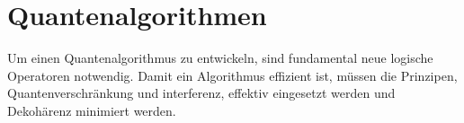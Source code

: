 \newcommand{\hadamard}{\ensuremath{%
  \frac{1}{\sqrt{2}}
  \begin{pmatrix}
    1 & 1 \\
    1 & -1
  \end{pmatrix}%
}}

\newcommand{\qubitnull}{\ensuremath{\begin{pmatrix}1\\0\end{pmatrix}}}
\newcommand{\qubiteins}{\ensuremath{\begin{pmatrix}0\\1\end{pmatrix}}}

\newcommand{\minusspin}{\ensuremath{\frac{1}{\sqrt{2}}(|0\rangle-|1\rangle)}}
\newcommand{\plusspin}{\ensuremath{\frac{1}{\sqrt{2}}(|0\rangle+|1\rangle)}}

\chapter{Quantenalgorithmen}
\label{section-Quantenalgorithmen}
Um einen Quantenalgorithmus zu entwickeln, sind fundamental neue logische Operatoren notwendig.
Damit ein Algorithmus effizient ist, müssen die Prinzipen, Quantenverschränkung und interferenz, effektiv eingesetzt werden und Dekohärenz minimiert werden.

